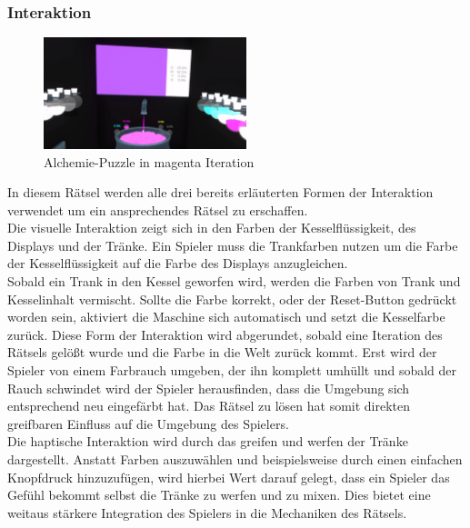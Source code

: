 \newpage


\subsubsection{Interaktion}

\begin{figure}
	\vspace*{-0.5cm}
	\includegraphics[width=5.9cm]{Pictures/Alchemie_Magenta}
	\caption{Alchemie-Puzzle in magenta Iteration}
	\vspace*{-0.5cm}
	\label{fig:alchemie_start}
\end{figure}

In diesem Rätsel werden alle drei bereits erläuterten Formen der Interaktion verwendet um ein ansprechendes Rätsel zu erschaffen.\\

Die visuelle Interaktion zeigt sich in den Farben der Kesselflüssigkeit, des Displays und der Tränke. Ein Spieler muss die Trankfarben nutzen um die Farbe der Kesselflüssigkeit auf die Farbe des Displays anzugleichen.\\

Sobald ein Trank in den Kessel geworfen wird, werden die Farben von Trank und Kesselinhalt vermischt. Sollte die Farbe korrekt, oder der \dq Reset\dq-Button gedrückt worden sein, aktiviert die Maschine sich automatisch und setzt die Kesselfarbe zurück. Diese Form der Interaktion wird abgerundet, sobald eine Iteration des Rätsels gelößt wurde und die Farbe in die Welt zurück kommt. Erst wird der Spieler von einem Farbrauch umgeben, der ihn komplett umhüllt und sobald der Rauch schwindet wird der Spieler herausfinden, dass die Umgebung sich entsprechend neu eingefärbt hat. Das Rätsel zu lösen hat somit direkten greifbaren Einfluss auf die Umgebung des Spielers.\\

Die haptische Interaktion wird durch das greifen und werfen der Tränke dargestellt. Anstatt Farben auszuwählen und beispielsweise durch einen einfachen Knopfdruck hinzuzufügen, wird hierbei Wert darauf gelegt, dass ein Spieler das Gefühl bekommt selbst die Tränke zu werfen und zu mixen. Dies bietet eine weitaus stärkere Integration des Spielers in die Mechaniken des Rätsels.

